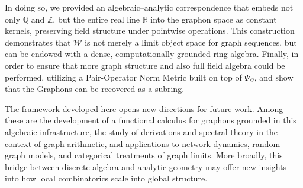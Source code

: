 \documentclass[11pt]{article}
\theoremstyle{definition}
\theoremstyle{plain}
\theoremstyle{remark}
\begin{document}
In doing so, we provided an algebraic–analytic correspondence that embeds not only \(\mathbb{Q}\) and \(\mathbb{Z}\), but the entire real line \(\mathbb{R}\) into the graphon space as constant kernels, preserving field structure under pointwise operations. This construction demonstrates that \(\mathcal{W}\) is not merely a limit object space for graph sequences, but can be endowed with a dense, computationally grounded ring algebra. Finally, in order to ensure that more graph structure and also full field algebra could be performed, utilizing a Pair-Operator Norm Metric built on top of \(\Psi_{\mathcal Q}\), and show that the Graphons can be recovered as a subring. 

The framework developed here opens new directions for future work. Among these are the development of a functional calculus for graphons grounded in this algebraic infrastructure, the study of derivations and spectral theory in the context of graph arithmetic, and applications to network dynamics, random graph models, and categorical treatments of graph limits. More broadly, this bridge between discrete algebra and analytic geometry may offer new insights into how local combinatorics scale into global structure.
\end{document}
